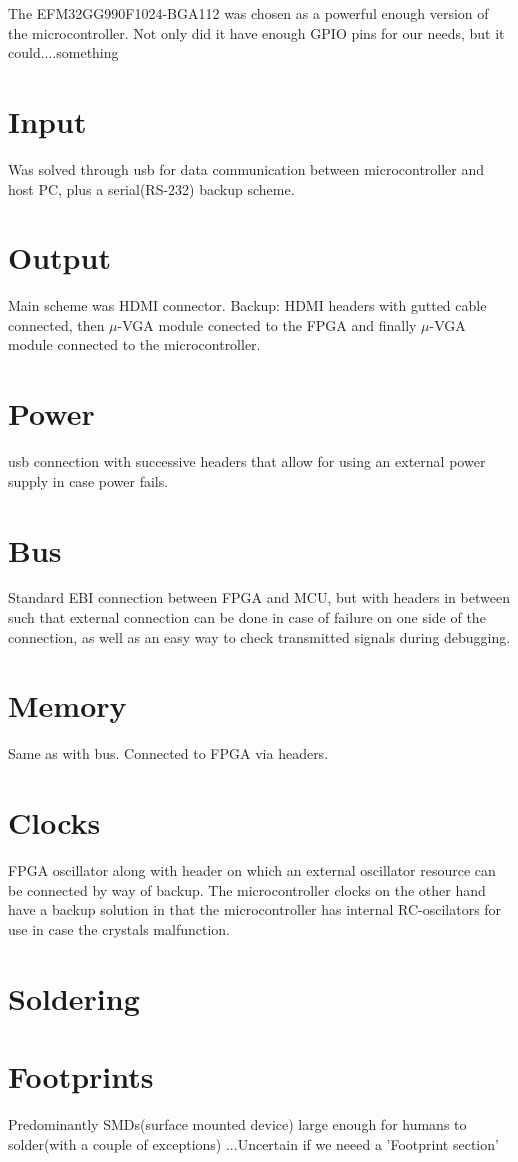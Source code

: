The EFM32GG990F1024-BGA112 was chosen as a powerful enough version of the microcontroller.
Not only did it have enough GPIO pins for our needs, but it could....something %

\section{Input}
Was solved through usb for data communication between microcontroller and host PC, plus a serial(RS-232) backup scheme.

\section{Output}
Main scheme was HDMI connector. Backup: HDMI headers with gutted cable connected, then $\mu$-VGA module conected to the FPGA and finally $\mu$-VGA module connected to the microcontroller.

\section{Power}
usb connection with successive headers that allow for using an external power supply in case power fails.

\section{Bus}
Standard EBI connection between FPGA and MCU, but with headers in between such that external connection can be done in case of failure on one side of the connection, as well as an easy way to check transmitted signals during debugging.

\section{Memory}
Same as with bus. Connected to FPGA via headers.
\section{Clocks}
FPGA oscillator along with header on which an external oscillator resource can be connected by way of backup.
The microcontroller clocks on the other hand have a backup solution in that the microcontroller has internal RC-oscilators for use in case the crystals malfunction.

\section{Soldering}



\section{Footprints}
Predominantly SMDs(surface mounted device) large enough for humans to solder(with a couple of exceptions)
...Uncertain if we neeed a 'Footprint section'


